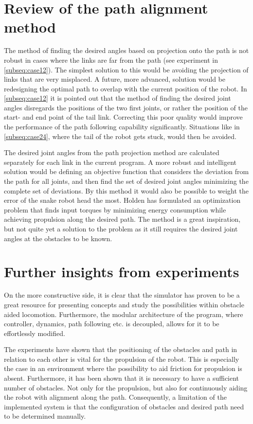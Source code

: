 \section{Review of the path alignment method}\label{sec:pathdiscussion}

The method of finding the desired angles based on projection onto the path is not robust in cases where the links are far from the path (see experiment in \ref{subseq:case12}). The simplest solution to this would be avoiding the projection of links that are very misplaced. A future, more advanced, solution would be redesigning the optimal path to overlap with the current position of the robot. In \ref{subseq:case12} it is pointed out that the method of finding the desired joint angles disregards the positions of the two first joints, or rather the position of the start- and end point of the tail link. Correcting this poor quality would improve the performance of the path following capability significantly. Situations like in \ref{subseq:case24}, where the tail of the robot gets stuck, would then be avoided.

The desired joint angles from the path projection method are calculated separately for each link in the current program. A more robust and intelligent solution would be defining an objective function that considers the deviation from the path for all joints, and then find the set of desired joint angles minimizing the complete set of deviations. By this method it would also be possible to weight the error of the snake robot head the most. Holden \cite{holden2014optimal} has formulated an optimization problem that finds input torques by minimizing energy consumption while achieving propulsion along the desired path. The method is a great inspiration, but not quite yet a solution to the problem as it still requires the desired joint angles at the obstacles to be known.

\section{Further insights from experiments}

On the more constructive side, it is clear that the simulator has proven to be a great resource for presenting concepts and study the possibilities within obstacle aided locomotion. Furthermore, the modular architecture of the program, where controller, dynamics, path following etc. is decoupled, allows for it to be effortlessly modified.

The experiments have shown that the positioning of the obstacles and path in relation to each other is vital for the propulsion of the robot. This is especially the case in an environment where the possibility to aid friction for propulsion is absent. Furthermore, it has been shown that it is necessary to have a sufficient number of obstacles. Not only for the propulsion, but also for continuously aiding the robot with alignment along the path. Consequently, a limitation of the implemented system is that the configuration of obstacles and desired path need to be determined manually.

